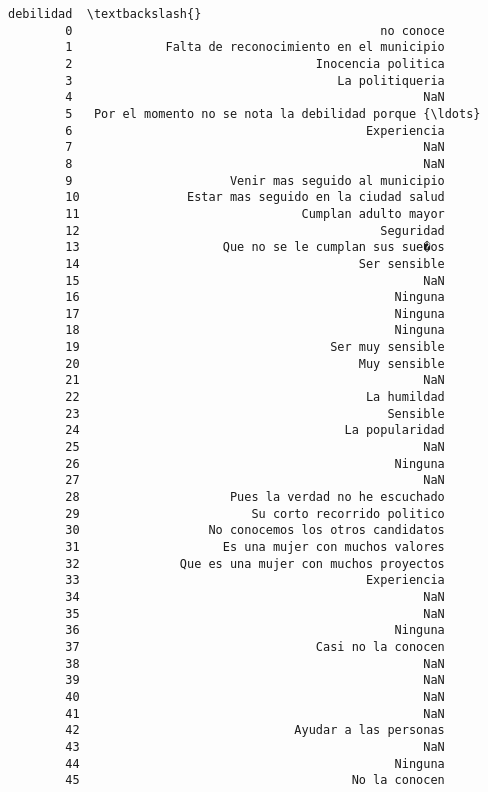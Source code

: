 \documentclass[11pt]{article}
\begin{document}
\begin{Verbatim}[commandchars=\\\{\}]
                                                    debilidad  \textbackslash{}
        0                                           no conoce   
        1             Falta de reconocimiento en el municipio   
        2                                  Inocencia politica   
        3                                     La politiqueria   
        4                                                 NaN   
        5   Por el momento no se nota la debilidad porque {\ldots}   
        6                                         Experiencia   
        7                                                 NaN   
        8                                                 NaN   
        9                      Venir mas seguido al municipio   
        10               Estar mas seguido en la ciudad salud   
        11                               Cumplan adulto mayor   
        12                                          Seguridad   
        13                    Que no se le cumplan sus sue�os   
        14                                       Ser sensible   
        15                                                NaN   
        16                                            Ninguna   
        17                                            Ninguna   
        18                                            Ninguna   
        19                                   Ser muy sensible   
        20                                       Muy sensible   
        21                                                NaN   
        22                                        La humildad   
        23                                           Sensible   
        24                                     La popularidad   
        25                                                NaN   
        26                                            Ninguna   
        27                                                NaN   
        28                     Pues la verdad no he escuchado   
        29                        Su corto recorrido politico   
        30                  No conocemos los otros candidatos   
        31                    Es una mujer con muchos valores   
        32              Que es una mujer con muchos proyectos   
        33                                        Experiencia   
        34                                                NaN   
        35                                                NaN   
        36                                            Ninguna   
        37                                 Casi no la conocen   
        38                                                NaN   
        39                                                NaN   
        40                                                NaN   
        41                                                NaN   
        42                              Ayudar a las personas   
        43                                                NaN   
        44                                            Ninguna   
        45                                      No la conocen   
        

\end{Verbatim}
\end{document}
